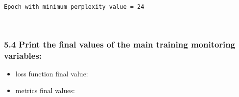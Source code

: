 \documentclass[10pt]{article}
\providecommand{\tightlist}{%
      \setlength{\itemsep}{0pt}\setlength{\parskip}{0pt}}
\begin{document}
    \begin{Verbatim}[commandchars=\\\{\}]
Epoch with minimum perplexity value = 24
    \end{Verbatim}

    \begin{center}
    \end{center}
    { \hspace*{\fill} \\}
    
    \hypertarget{print-the-final-values-of-the-main-training-monitoring-variables}{%
\subsubsection{5.4 Print the final values of the main training
monitoring
variables:}\label{print-the-final-values-of-the-main-training-monitoring-variables}}

\begin{itemize}
\tightlist
\item
  loss function final value:
\item
  metrics final values:
\end{itemize}
\end{document}
